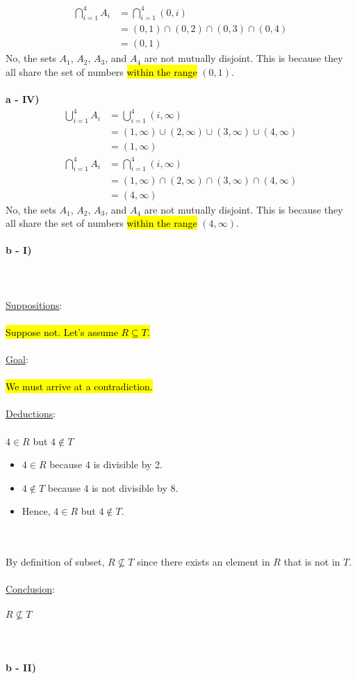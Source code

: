 \documentclass[12pt]{article}
\newcommand{\xlist}[1]{
    \begin{itemize}
        \renewcommand{\labelitemi}{$\centerdot$}
        #1
    \end{itemize}
    \newblock
    \\ \\
}
\newcommand{\xsupposition}[1]{
    \underline{Suppositions}:
    \\ \\
    #1
    \\ \\
}
\newcommand{\xgoal}[1]{
    \underline{Goal}:
    \\ \\
    #1
    \\ \\
}
\newcommand{\xdeductions}{
    \underline{Deductions}:
    \\ \\
}
\newcommand{\xconclusion}[1]{
    \underline{Conclusion}:
    \\ \\
    #1
    \\ \\
}
\begin{document}
\begin{align*}
  \bigcap_{i=1}^{4}A_i &= \bigcap_{i=1}^{4}(0, i) \\
  &= (0, 1) \cap (0, 2) \cap (0, 3) \cap (0, 4) \\
  &= (0, 1)
\end{align*}
No, the sets $A_1$, $A_2$, $A_3$, and $A_4$ are not mutually disjoint. This is because they all share the set of numbers \hl{within the range} $(0, 1)$.
\\ \\
\textbf{a - IV)}
\begin{align*}
  \bigcup_{i=1}^{4}A_i &= \bigcup_{i=1}^{4}(i, \infty) \\
  &= (1, \infty) \cup (2, \infty) \cup (3, \infty) \cup (4, \infty) \\
  &= (1, \infty)
\end{align*}
\begin{align*}
  \bigcap_{i=1}^{4}A_i &= \bigcap_{i=1}^{4}(i, \infty) \\
  &= (1, \infty) \cap (2, \infty) \cap (3, \infty) \cap (4, \infty) \\
  &= (4, \infty)
\end{align*}
No, the sets $A_1$, $A_2$, $A_3$, and $A_4$ are not mutually disjoint. This is because they all share the set of numbers \hl{within the range} $(4, \infty)$.
\\ \\
\textbf{b - I)} \\ \\
\\ \\
\xsupposition{\hl{Suppose not. Let's assume $R \subseteq T$.}}
\xgoal{\hl{We must arrive at a contradiction.}}
\xdeductions
$4 \in R$ but $4 \not\in T$
\xlist{
  \item $4 \in R$ because $4$ is divisible by 2.
  \item $4 \not\in T$ because $4$ is not divisible by 8.
  \item Hence, $4 \in R$ but $4 \not\in T$.
}
By definition of subset, $R \not\subseteq T$ since there exists an element in $R$ that is not in $T$.
\\ \\
\xconclusion{$R \not\subseteq T$}
\\ \\
\textbf{b - II)} \\ \\
\\ \\
\end{document}
